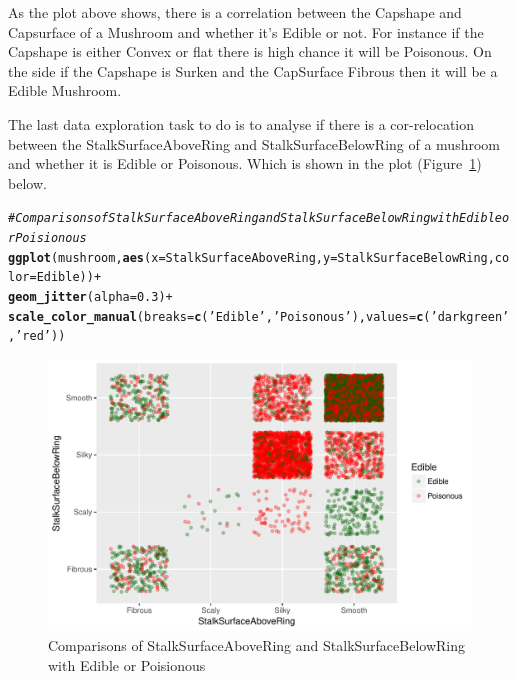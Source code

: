 \documentclass[10pt  ,usenames, dvipsnames]{article}\usepackage[]{graphicx}\usepackage[]{color}
\makeatletter
\newcommand{\hlnum}[1]{\textcolor[rgb]{0.686,0.059,0.569}{#1}}%
\newcommand{\hlstr}[1]{\textcolor[rgb]{0.192,0.494,0.8}{#1}}%
\newcommand{\hlcom}[1]{\textcolor[rgb]{0.678,0.584,0.686}{\textit{#1}}}%
\newcommand{\hlopt}[1]{\textcolor[rgb]{0,0,0}{#1}}%
\newcommand{\hlstd}[1]{\textcolor[rgb]{0.345,0.345,0.345}{#1}}%
\newcommand{\hlkwc}[1]{\textcolor[rgb]{0.333,0.667,0.333}{#1}}%
\newcommand{\hlkwd}[1]{\textcolor[rgb]{0.737,0.353,0.396}{\textbf{#1}}}%
\newenvironment{kframe}{%
 \def\at@end@of@kframe{}%
 \ifinner\ifhmode%
  \def\at@end@of@kframe{\end{minipage}}%
  \begin{minipage}{\columnwidth}%
 \fi\fi%
 \def\FrameCommand##1{\hskip\@totalleftmargin \hskip-\fboxsep
 \colorbox{shadecolor}{##1}\hskip-\fboxsep
     \hskip-\linewidth \hskip-\@totalleftmargin \hskip\columnwidth}%
 \MakeFramed {\advance\hsize-\width
   \@totalleftmargin\z@ \linewidth\hsize
   \@setminipage}}%
 {\par\unskip\endMakeFramed%
 \at@end@of@kframe}
\newenvironment{knitrout}{}{} %
\makeatother
\begin{document}
As the plot above shows, there is a correlation between the Capshape and Capsurface of a Mushroom and whether it's Edible or not. For instance if the Capshape is either Convex or flat there is high chance it will be Poisonous. On the side if the Capshape is Surken and the CapSurface Fibrous then it will be a Edible Mushroom.

\clearpage

The last data exploration task to do is to analyse if there is a cor-relocation between the StalkSurfaceAboveRing and StalkSurfaceBelowRing of a mushroom and whether it is Edible or Poisonous. Which is shown in the plot (Figure~\ref{fig3}) below.

\begin{knitrout}
\color{fgcolor}\begin{kframe}
\begin{alltt}
\hlcom{#Comparisons of StalkSurfaceAboveRing and StalkSurfaceBelowRing with Edible or Poisionous}
\hlkwd{ggplot}\hlstd{(mushroom,}\hlkwd{aes}\hlstd{(}\hlkwc{x}\hlstd{=StalkSurfaceAboveRing,} \hlkwc{y}\hlstd{=StalkSurfaceBelowRing,} \hlkwc{color}\hlstd{=Edible))} \hlopt{+}
  \hlkwd{geom_jitter}\hlstd{(}\hlkwc{alpha}\hlstd{=}\hlnum{0.3}\hlstd{)} \hlopt{+}
  \hlkwd{scale_color_manual}\hlstd{(}\hlkwc{breaks} \hlstd{=} \hlkwd{c}\hlstd{(}\hlstr{'Edible'}\hlstd{,}\hlstr{'Poisonous'}\hlstd{),} \hlkwc{values}\hlstd{=}\hlkwd{c}\hlstd{(}\hlstr{'darkgreen'}\hlstd{,}\hlstr{'red'}\hlstd{))}
\end{alltt}
\end{kframe}
\end{knitrout}

\begin{figure}[H]
\begin{center}
\begin{knitrout}
\color{fgcolor}
\includegraphics[width=.76\linewidth]{figure/unnamed-chunk-20-1} 

\end{knitrout}
\caption {Comparisons of StalkSurfaceAboveRing and StalkSurfaceBelowRing with Edible or Poisionous}
\label{fig3}
\end {center}
\end {figure}
\end{document}
